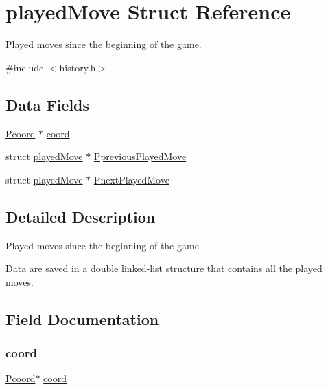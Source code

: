 \hypertarget{structplayed_move}{}\section{played\+Move Struct Reference}
\label{structplayed_move}


Played moves since the beginning of the game.  




{\ttfamily \#include $<$history.\+h$>$}

\subsection*{Data Fields}
\begin{DoxyCompactItemize}
\item 
\hyperlink{board_8h_ab8cc720589a392832ddcc5e65efcbb47}{Pcoord} $\ast$ \hyperlink{structplayed_move_a31936ecfefc6cca619f5fbb6bbe5d62a}{coord}
\item 
struct \hyperlink{structplayed_move}{played\+Move} $\ast$ \hyperlink{structplayed_move_ae1f0ee9fe8e8a08023879b9656a55f62}{Pprevious\+Played\+Move}
\item 
struct \hyperlink{structplayed_move}{played\+Move} $\ast$ \hyperlink{structplayed_move_a3d7384aebd5f0ff66a5ab19773ea1136}{Pnext\+Played\+Move}
\end{DoxyCompactItemize}


\subsection{Detailed Description}
Played moves since the beginning of the game. 

Data are saved in a double linked-\/list structure that contains all the played moves. 

\subsection{Field Documentation}
\mbox{\label{structplayed_move_a31936ecfefc6cca619f5fbb6bbe5d62a}} 
\subsubsection{\texorpdfstring{coord}{coord}}
{\footnotesize\ttfamily \hyperlink{board_8h_ab8cc720589a392832ddcc5e65efcbb47}{Pcoord}$\ast$ \hyperlink{structcoord}{coord}}

